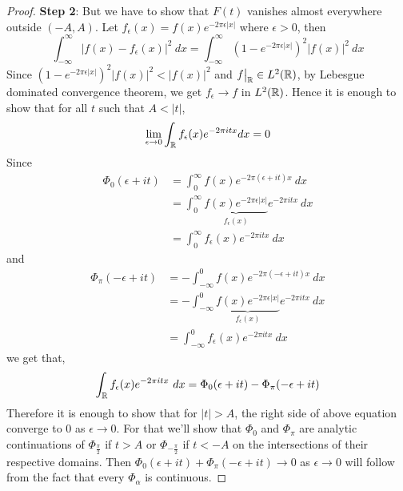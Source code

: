 \begin{proof}
  \textbf{Step 2}: But we have to show that $F(t)$ vanishes almost everywhere outside $(-A, A)$. Let $f_\epsilon(x) = f(x)e^{-2\pi \epsilon |x|}$ where $\epsilon > 0$, then $$\int_{-\infty}^{\infty} |f(x) -f_\epsilon(x)|^2 \ dx = \int_{-\infty}^\infty (1-e^{-2\pi \epsilon|x|})^2 |f(x)|^2 \ dx$$
  Since $(1-e^{-2\pi \epsilon|x|})^2 |f(x)|^2 < |f(x)|^2$ and $f\big|_\mathbb R \in L^2(\mathbb R)$, by Lebesgue dominated convergence theorem, we get $f_\epsilon \to f$ in $L^2(\mathbb R)$. Hence it is enough to show that for all $t$ such that $A < |t|$, $$\lim_{\epsilon \to 0}\int_\mathbb R f_\epsilon(x)e^{-2\pi itx} dx = 0$$
  Since
  \begin{align*}
    \Phi_0(\epsilon + it) &= \int_0^\infty f(x) e^{-2\pi (\epsilon + it)x} \ dx\\
    &= \int_0^\infty \underbrace{f(x) e^{-2\pi \epsilon |x|}}_{f_\epsilon(x)} e^{-2 \pi i tx} \ dx \\
    &= \int_0^\infty f_\epsilon(x) e^{-2\pi i tx} \ dx
  \end{align*}
  and
  \begin{align*}
    \Phi_\pi(-\epsilon + it) &= -\int^0_{-\infty} f(x) e^{-2\pi (-\epsilon + it)x} \ dx\\
    &= - \int^0_{-\infty} \underbrace{f(x) e^{-2\pi \epsilon |x|}}_{f_\epsilon(x)} e^{-2 \pi i tx} \ dx \\
    &= \int^0_{-\infty} f_\epsilon(x) e^{-2\pi i tx} \ dx
  \end{align*}
  we get that,
  $$\int_\mathbb R f_\epsilon(x) e^{-2\pi itx} \ dx = \Phi_0(\epsilon+it) - \Phi_\pi(-\epsilon+it)$$
  Therefore it is enough to show that for $|t| > A$, the right side of above equation converge to $0$ as $\epsilon \to 0$. For that we'll show that $\Phi_0$ and $\Phi_\pi$ are analytic continuations of $\Phi_{\frac{\pi}{2}}$ if $t>A$ or $\Phi_{-\frac{\pi}{2}}$ if $t <-A$ on the intersections of their respective domains. Then $\Phi_0(\epsilon+it) + \Phi_\pi(-\epsilon+it) \to 0$ as $\epsilon \to 0$ will follow from the fact that every $\Phi_\alpha$ is continuous. 


\end{proof}
